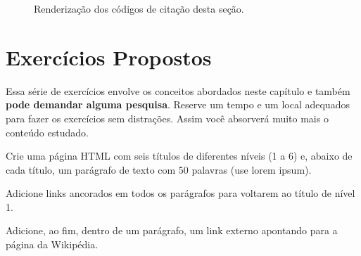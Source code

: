 \begin{figure}[ht!]    
    \caption{Renderização dos códigos de citação desta seção.}
    \label{fig:html_citacoes}
\end{figure}

\section{Exercícios Propostos}

Essa série de exercícios envolve os conceitos abordados neste capítulo e também \textbf{pode demandar alguma pesquisa}. Reserve um tempo e um local adequados para fazer os exercícios sem distrações. Assim você absorverá muito mais o conteúdo estudado.

\begin{exercise}
Crie uma página HTML com seis títulos de diferentes níveis (1 a 6) e, abaixo de cada título, um parágrafo de texto com 50 palavras (use lorem ipsum).
\end{exercise}

\begin{exercise}
Adicione links ancorados em todos os parágrafos para voltarem ao título de nível 1.
\end{exercise}

\begin{exercise}
Adicione, ao fim, dentro de um parágrafo, um link externo apontando para a página da Wikipédia.
\end{exercise}

